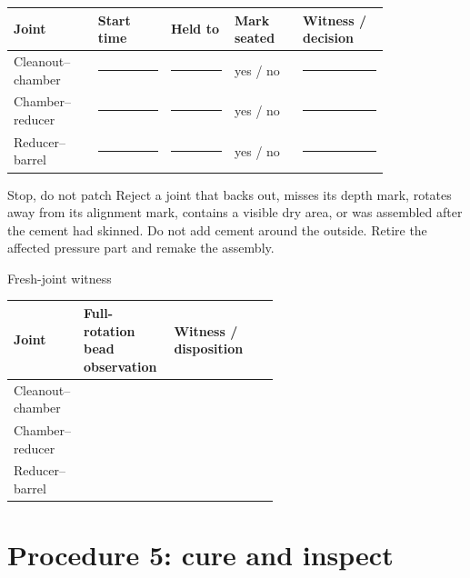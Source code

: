 \begin{longtable}{@{}p{0.18\linewidth}p{0.16\linewidth}p{0.14\linewidth}p{0.15\linewidth}p{0.19\linewidth}@{}}
\toprule
\textbf{Joint} & \textbf{Start time} & \textbf{Held to} & \textbf{Mark seated} & \textbf{Witness / decision}\\
\midrule
\endhead
Cleanout--chamber & \rule{0.55in}{0.4pt} & \rule{0.45in}{0.4pt} & yes / no & \rule{0.9in}{0.4pt}\\
Chamber--reducer & \rule{0.55in}{0.4pt} & \rule{0.45in}{0.4pt} & yes / no & \rule{0.9in}{0.4pt}\\
Reducer--barrel & \rule{0.55in}{0.4pt} & \rule{0.45in}{0.4pt} & yes / no & \rule{0.9in}{0.4pt}\\
\bottomrule
\end{longtable}

\begin{teloshazard}{Stop, do not patch}
Reject a joint that backs out, misses its depth mark, rotates away from its
alignment mark, contains a visible dry area, or was assembled after the cement
had skinned. Do not add cement around the outside. Retire the affected pressure
part and remake the assembly. 
\end{teloshazard}

\begin{teloscard}{Fresh-joint witness}
\begin{tabularx}{\linewidth}{@{}p{0.24\linewidth}p{0.34\linewidth}L@{}}
\toprule
\textbf{Joint} & \textbf{Full-rotation bead observation} & \textbf{Witness / disposition}\\
\midrule
Cleanout--chamber & \rule{0pt}{1.55em} & \\
Chamber--reducer & \rule{0pt}{1.55em} & \\
Reducer--barrel & \rule{0pt}{1.55em} & \\
\bottomrule
\end{tabularx}
\end{teloscard}

\clearpage
\section{Procedure 5: cure and inspect}
\begin{center}
\end{center}

